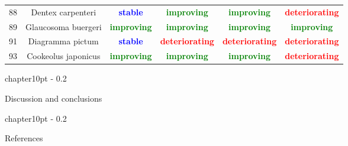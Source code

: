 \documentclass{report}\usepackage[]{graphicx}\usepackage[]{color}
\makeatletter
\renewcommand\chapter{\@startsection%
{chapter}{1}{0pt}%
{-\baselineskip}%
{0.2\baselineskip}%
{\raggedright\bf}}%
\makeatother
\begin{document}
\begin{table}[ht]
{\begin{tabular}{cccccc}
   88 & Dentex carpenteri & \textcolor{blue}{\textbf{stable}} & \textcolor{green}{\textbf{improving}} & \textcolor{green}{\textbf{improving}} & \textcolor{red}{\textbf{deteriorating}} \\ 
   89 & Glaucosoma buergeri & \textcolor{green}{\textbf{improving}} & \textcolor{green}{\textbf{improving}} & \textcolor{green}{\textbf{improving}} & \textcolor{green}{\textbf{improving}} \\ 
   91 & Diagramma pictum & \textcolor{blue}{\textbf{stable}} & \textcolor{red}{\textbf{deteriorating}} & \textcolor{red}{\textbf{deteriorating}} & \textcolor{red}{\textbf{deteriorating}} \\ 
   93 & Cookeolus japonicus & \textcolor{green}{\textbf{improving}} & \textcolor{green}{\textbf{improving}} & \textcolor{green}{\textbf{improving}} & \textcolor{red}{\textbf{deteriorating}} \\ 
   \hline
\end{tabular}
}
\end{table}

\clearpage
\newpage


\chapter{Discussion and conclusions}



%

\newpage

\chapter{References}

\end{document}
